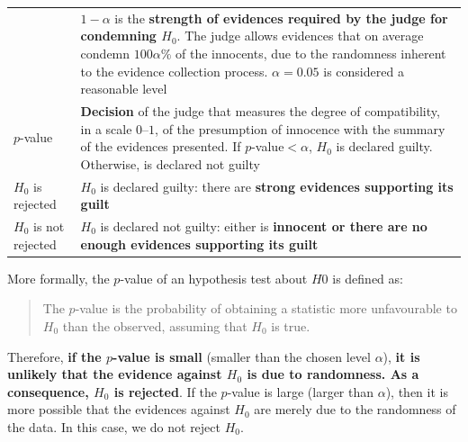 \documentclass[]{book}
\theoremstyle{definition}
\theoremstyle{definition}
\theoremstyle{definition}
\theoremstyle{remark}
\begin{document}
\begin{longtable}[]{@{}ll@{}}
\begin{minipage}[t]{0.38\columnwidth}
\end{minipage} & \begin{minipage}[t]{0.56\columnwidth}\raggedright\strut
\(1-\alpha\) is the \textbf{strength of evidences required by the judge
for condemning \(H_0\)}. The judge allows evidences that on average
condemn \(100\alpha\%\) of the innocents, due to the randomness inherent
to the evidence collection process. \(\alpha=0.05\) is considered a
reasonable level\strut
\end{minipage}\tabularnewline
\begin{minipage}[t]{0.38\columnwidth}\raggedright\strut
\(p\)-value\strut
\end{minipage} & \begin{minipage}[t]{0.56\columnwidth}\raggedright\strut
\textbf{Decision} of the judge that measures the degree of
compatibility, in a scale \(0\)--\(1\), of the presumption of innocence
with the summary of the evidences presented. If \(p\)-value\(<\alpha\),
\(H_0\) is declared guilty. Otherwise, is declared not guilty\strut
\end{minipage}\tabularnewline
\begin{minipage}[t]{0.38\columnwidth}\raggedright\strut
\(H_0\) is rejected\strut
\end{minipage} & \begin{minipage}[t]{0.56\columnwidth}\raggedright\strut
\(H_0\) is declared guilty: there are \textbf{strong evidences
supporting its guilt}\strut
\end{minipage}\tabularnewline
\begin{minipage}[t]{0.38\columnwidth}\raggedright\strut
\(H_0\) is not rejected\strut
\end{minipage} & \begin{minipage}[t]{0.56\columnwidth}\raggedright\strut
\(H_0\) is declared not guilty: either is \textbf{innocent or there are
no enough evidences supporting its guilt}\strut
\end{minipage}\tabularnewline
\bottomrule
\end{longtable}

More formally, the \(p\)-value of an hypothesis test about \(H0\) is
defined as:

\begin{quote}
The \(p\)-value is the probability of obtaining a statistic more
unfavourable to \(H_0\) than the observed, assuming that \(H_0\) is
true.
\end{quote}

Therefore, \textbf{if the \(p\)-value is small} (smaller than the chosen
level \(\alpha\)), \textbf{it is unlikely that the evidence against
\(H_0\) is due to randomness. As a consequence, \(H_0\) is rejected}. If
the \(p\)-value is large (larger than \(\alpha\)), then it is more
possible that the evidences against \(H_0\) are merely due to the
randomness of the data. In this case, we do not reject \(H_0\).
\end{document}
